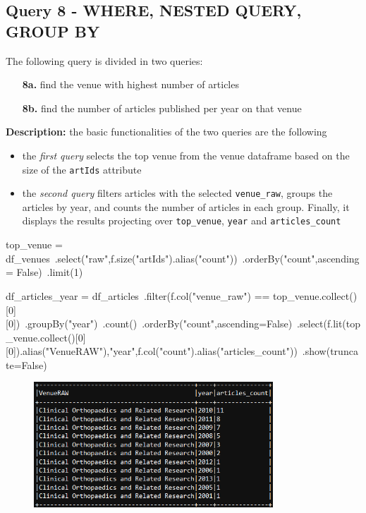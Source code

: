 \documentclass{Configuration_Files/PoliMi3i_thesis}
\begin{document}
\subsection{Query 8 - WHERE, NESTED QUERY, GROUP BY}
The following query is divided in two queries:
\begin{itemize}
    \item[\textbf{8a.}] find the venue with highest number of articles
    \item[\textbf{8b.}] find the number of articles published per year on that venue
\end{itemize}
\textbf{Description:} the basic functionalities of the two queries are the following
                    \begin{itemize}
                        \item the \emph{first query} selects the top venue from the venue dataframe based on the size of the \verb|artIds| attribute
                        \item the \emph{second query} filters articles with the selected \verb|venue_raw|, groups the articles by year, and counts the number
                            of articles in each group. Finally, it displays the results projecting over \verb|top_venue|, \verb|year| and \verb|articles_count| \\
                    \end{itemize}
\begin{python}
top_venue = df_venues\
                .select("raw",f.size("artIds").alias("count"))\
                .orderBy("count",ascending = False)\
                .limit(1)

df_articles_year = df_articles\
                        .filter(f.col("venue_raw") == top_venue.collect()[0][0])\
                        .groupBy("year")\
                        .count()\
                        .orderBy("count",ascending=False)\
                        .select(f.lit(top_venue.collect()[0][0]).alias("VenueRAW"),"year",f.col("count").alias("articles_count"))\
                        .show(truncate=False)
\end{python}
\begin{figure}[H]
\centering
\includegraphics[width=0.8\textwidth]{query/spark_q8.PNG}
\label{fig:query8}
\end{figure}
\end{document}
